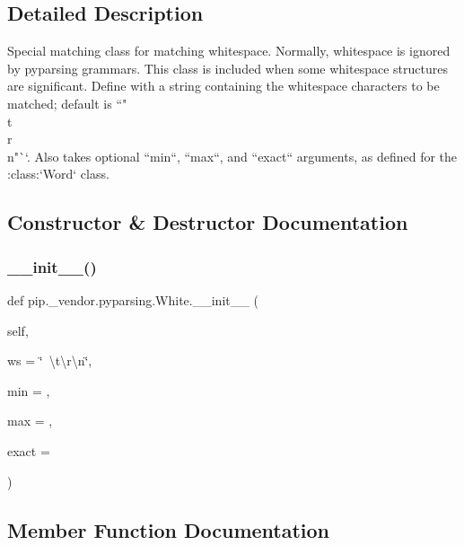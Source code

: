 \subsection{Detailed Description}
\begin{DoxyVerb}Special matching class for matching whitespace.  Normally,
whitespace is ignored by pyparsing grammars.  This class is included
when some whitespace structures are significant.  Define with
a string containing the whitespace characters to be matched; default
is ``" \\t\\r\\n"``.  Also takes optional ``min``,
``max``, and ``exact`` arguments, as defined for the
:class:`Word` class.
\end{DoxyVerb}
 

\subsection{Constructor \& Destructor Documentation}
\mbox{\label{classpip_1_1__vendor_1_1pyparsing_1_1White_a3e83bcc290ba3a375101c16286a9a312}} 
\subsubsection{\texorpdfstring{\+\_\+\+\_\+init\+\_\+\+\_\+()}{\_\_init\_\_()}}
{\footnotesize\ttfamily def pip.\+\_\+vendor.\+pyparsing.\+White.\+\_\+\+\_\+init\+\_\+\+\_\+ (\begin{DoxyParamCaption}\item[{}]{self,  }\item[{}]{ws = {\ttfamily \char`\"{}~\textbackslash{}t\textbackslash{}r\textbackslash{}n\char`\"{}},  }\item[{}]{min = {},  }\item[{}]{max = {},  }\item[{}]{exact = {} }\end{DoxyParamCaption})}



\subsection{Member Function Documentation}
\mbox{\label{classpip_1_1__vendor_1_1pyparsing_1_1White_a4e1e1af202fa7f7e26792b3e4284043f}} 
